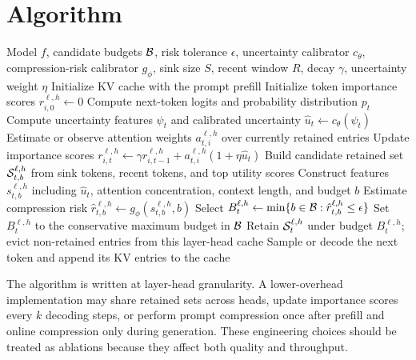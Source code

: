 \section{Algorithm}

\begin{algorithm}[t]
\caption{Uncertainty-Calibrated KV Cache Compression (\uckv{})}
\label{alg:uckv}
\begin{algorithmic}[1]
\Require Model $f$, candidate budgets $\mathcal{B}$, risk tolerance $\epsilon$, uncertainty calibrator $c_{\theta}$, compression-risk calibrator $g_{\phi}$, sink size $S$, recent window $R$, decay $\gamma$, uncertainty weight $\eta$
\State Initialize KV cache with the prompt prefill
\State Initialize token importance scores $r_{i,0}^{\ell,h}\gets 0$
    \State Compute next-token logits and probability distribution $p_t$
    \State Compute uncertainty features $\psi_t$ and calibrated uncertainty $\hat{u}_t \gets c_{\theta}(\psi_t)$
        \State Estimate or observe attention weights $a_{t,i}^{\ell,h}$ over currently retained entries
        \State Update importance scores $r_{i,t}^{\ell,h}\gets \gamma r_{i,t-1}^{\ell,h}+a_{t,i}^{\ell,h}(1+\eta\hat{u}_t)$
            \State Build candidate retained set $\mathcal{S}_{t,b}^{\ell,h}$ from sink tokens, recent tokens, and top utility scores
            \State Construct features $s_{t,b}^{\ell,h}$ including $\hat{u}_t$, attention concentration, context length, and budget $b$
            \State Estimate compression risk $\hat{r}_{t,b}^{\ell,h}\gets g_{\phi}(s_{t,b}^{\ell,h},b)$
        \EndFor
        \State Select $B_{t}^{\ell,h}\gets \min\{b\in\mathcal{B}: \hat{r}_{t,b}^{\ell,h}\le \epsilon\}$
            \State Set $B_t^{\ell,h}$ to the conservative maximum budget in $\mathcal{B}$
        \EndIf
        \State Retain $\mathcal{S}_t^{\ell,h}$ under budget $B_t^{\ell,h}$; evict non-retained entries from this layer-head cache
    \EndFor
    \State Sample or decode the next token and append its KV entries to the cache
\EndFor
\end{algorithmic}
\end{algorithm}

The algorithm is written at layer-head granularity. A lower-overhead implementation may share retained sets across heads, update importance scores every $k$ decoding steps, or perform prompt compression once after prefill and online compression only during generation. These engineering choices should be treated as ablations because they affect both quality and throughput.

